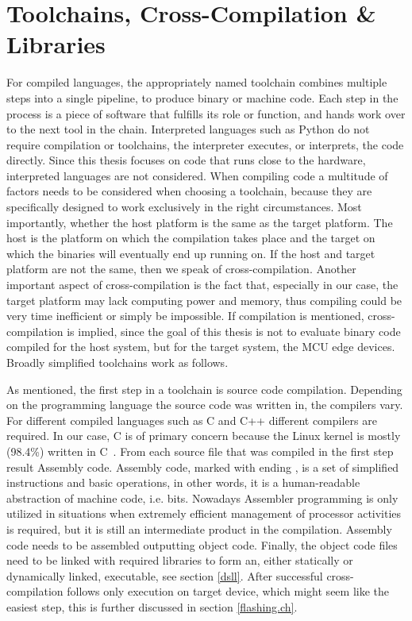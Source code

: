 \section{Toolchains, Cross-Compilation \& Libraries}\label{toolchains}
For compiled languages, the appropriately named toolchain combines multiple steps into a single pipeline, to produce binary or machine code. Each step in the process is a piece of software that fulfills its role or function, and hands work over to the next tool in the chain. Interpreted languages such as Python do not require compilation or toolchains, the interpreter executes, or interprets, the code directly. Since this thesis focuses on code that runs close to the hardware, interpreted languages are not considered. When compiling code a multitude of factors needs to be considered when choosing a toolchain, because they are specifically designed to work exclusively in the right circumstances. Most importantly, whether the host platform is the same as the target platform. The host is the platform on which the compilation takes place and the target on which the binaries will eventually end up running on. If the host and target platform are not the same, then we speak of cross-compilation. Another important aspect of cross-compilation is the fact that, especially in our case, the target platform may lack computing power and memory, thus compiling could be very time inefficient or simply be impossible. If compilation is mentioned, cross-compilation is implied, since the goal of this thesis is not to evaluate binary code compiled for the host system, but for the target system, the MCU edge devices. Broadly simplified toolchains work as follows.

As mentioned, the first step in a toolchain is source code compilation. Depending on the programming language the source code was written in, the compilers vary. For different compiled languages such as C and C++ different compilers are required. In our case, C is of primary concern because the Linux kernel is mostly (98.4\%) written in C~\cite{githubLinux}. From each source file that was compiled in the first step result Assembly code. Assembly code, marked with ending , is a set of simplified instructions and basic operations, in other words, it is a human-readable abstraction of machine code, i.e. bits.
Nowadays Assembler programming is only utilized in situations when extremely efficient management of processor activities is required, but it is still an intermediate product in the compilation. Assembly code needs to be assembled outputting object code. Finally, the object code files need to be linked with required libraries to form an, either statically or dynamically linked, executable, see section \ref{dsll}. After successful cross-compilation follows only execution on target device, which might seem like the easiest step, this is further discussed in section \ref{flashing.ch}.

